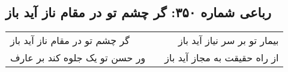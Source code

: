 \begin{center}
\section*{رباعی شماره ۳۵۰: گر چشم تو در مقام ناز آید باز}
\label{sec:sh350}
\begin{longtable}{l p{0.5cm} r}
گر چشم تو در مقام ناز آید باز
&&
بیمار تو بر سر نیاز آید باز
\\
ور حسن تو یک جلوه کند بر عارف
&&
از راه حقیقت به مجاز آید باز
\\
\end{longtable}
\end{center}
